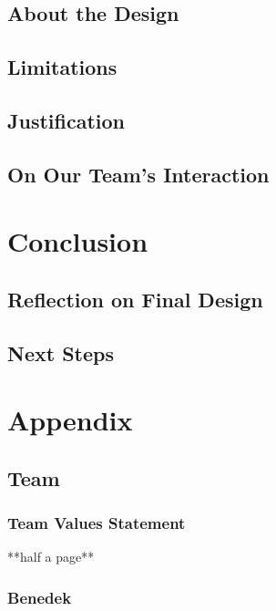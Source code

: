 \documentclass[12pt]{article}
\begin{document}
\begin{multicols*}{2}
        \subsection{About the Design}

        \subsection{Limitations}

        \subsection{Justification}

        \subsection{On Our Team's Interaction}

    \section{Conclusion}
        \subsection{Reflection on Final Design}

        \subsection{Next Steps}


    \newpage

    
    

    \newpage

    \section{Appendix}
        \subsection{Team}
            \subsubsection{Team Values Statement}
                **half a page**

            \subsubsection{Benedek}


\end{multicols*}
\end{document}
